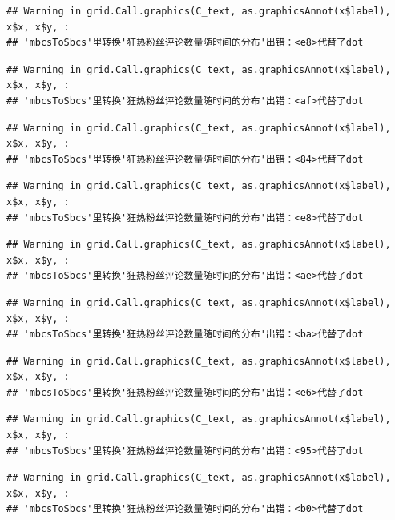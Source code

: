 \documentclass[
]{article}
\begin{document}
\begin{verbatim}
## Warning in grid.Call.graphics(C_text, as.graphicsAnnot(x$label), x$x, x$y, :
## 'mbcsToSbcs'里转换'狂热粉丝评论数量随时间的分布'出错：<e8>代替了dot
\end{verbatim}

\begin{verbatim}
## Warning in grid.Call.graphics(C_text, as.graphicsAnnot(x$label), x$x, x$y, :
## 'mbcsToSbcs'里转换'狂热粉丝评论数量随时间的分布'出错：<af>代替了dot
\end{verbatim}

\begin{verbatim}
## Warning in grid.Call.graphics(C_text, as.graphicsAnnot(x$label), x$x, x$y, :
## 'mbcsToSbcs'里转换'狂热粉丝评论数量随时间的分布'出错：<84>代替了dot
\end{verbatim}

\begin{verbatim}
## Warning in grid.Call.graphics(C_text, as.graphicsAnnot(x$label), x$x, x$y, :
## 'mbcsToSbcs'里转换'狂热粉丝评论数量随时间的分布'出错：<e8>代替了dot
\end{verbatim}

\begin{verbatim}
## Warning in grid.Call.graphics(C_text, as.graphicsAnnot(x$label), x$x, x$y, :
## 'mbcsToSbcs'里转换'狂热粉丝评论数量随时间的分布'出错：<ae>代替了dot
\end{verbatim}

\begin{verbatim}
## Warning in grid.Call.graphics(C_text, as.graphicsAnnot(x$label), x$x, x$y, :
## 'mbcsToSbcs'里转换'狂热粉丝评论数量随时间的分布'出错：<ba>代替了dot
\end{verbatim}

\begin{verbatim}
## Warning in grid.Call.graphics(C_text, as.graphicsAnnot(x$label), x$x, x$y, :
## 'mbcsToSbcs'里转换'狂热粉丝评论数量随时间的分布'出错：<e6>代替了dot
\end{verbatim}

\begin{verbatim}
## Warning in grid.Call.graphics(C_text, as.graphicsAnnot(x$label), x$x, x$y, :
## 'mbcsToSbcs'里转换'狂热粉丝评论数量随时间的分布'出错：<95>代替了dot
\end{verbatim}

\begin{verbatim}
## Warning in grid.Call.graphics(C_text, as.graphicsAnnot(x$label), x$x, x$y, :
## 'mbcsToSbcs'里转换'狂热粉丝评论数量随时间的分布'出错：<b0>代替了dot
\end{verbatim}
\end{document}
